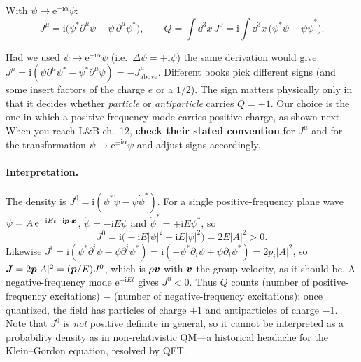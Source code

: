 \documentclass[11pt]{article}
\begin{document}
\begin{keyresult}
With $\psi\to\mathrm e^{-\mathrm i\alpha}\psi$:
\begin{equation}
  J^\mu=\mathrm i\big(\psi^*\partial^\mu\psi-\psi\,\partial^\mu\psi^*\big),\qquad Q=\int\dd^3x\,J^0=\mathrm i\int\dd^3x\,\big(\psi^*\dot\psi-\psi\dot\psi^*\big).
\end{equation}
\end{keyresult}

\begin{pitfall}
Had we used $\psi\to\mathrm e^{+\mathrm i\alpha}\psi$ (i.e.\ $\Delta\psi=+\mathrm i\psi$) the same derivation would give $J^\mu=\mathrm i(\psi\partial^\mu\psi^*-\psi^*\partial^\mu\psi)=-J^\mu_{\text{above}}$. Different books pick different signs (and some insert factors of the charge $e$ or a $1/2$). The sign matters physically only in that it decides whether \emph{particle} or \emph{antiparticle} carries $Q=+1$. Our choice is the one in which a positive-frequency mode carries positive charge, as shown next. When you reach L\&B ch.~12, \textbf{check their stated convention} for $J^\mu$ and for the transformation $\psi\to\mathrm e^{\pm\mathrm i\alpha}\psi$ and adjust signs accordingly.
\end{pitfall}

\paragraph{Interpretation.} The density is $J^0=\mathrm i(\psi^*\dot\psi-\psi\dot\psi^*)$. For a single positive-frequency plane wave $\psi=A\,\mathrm e^{-\mathrm iEt+\mathrm i\bm{p}\cdot\bm{x}}$, $\dot\psi=-\mathrm iE\psi$ and $\dot\psi^*=+\mathrm iE\psi^*$, so
\begin{equation}
  J^0=\mathrm i\big(-\mathrm iE|\psi|^2-\mathrm iE|\psi|^2\big)=2E|A|^2>0. 
\end{equation}
Likewise $J^i=\mathrm i(\psi^*\partial^i\psi-\psi\partial^i\psi^*)=\mathrm i(-\psi^*\partial_i\psi+\psi\partial_i\psi^*)=2p_i|A|^2$, so $\bm{J}=2\bm{p}|A|^2=(\bm{p}/E)J^0$, which is $\rho\bm{v}$ with $\bm{v}$ the group velocity, as it should be. A negative-frequency mode $\mathrm e^{+\mathrm iEt}$ gives $J^0<0$. Thus $Q$ counts (number of positive-frequency excitations) $-$ (number of negative-frequency excitations): once quantized, the field has particles of charge $+1$ and antiparticles of charge $-1$. Note that $J^0$ is \emph{not} positive definite in general, so it cannot be interpreted as a probability density as in non-relativistic QM---a historical headache for the Klein--Gordon equation, resolved by QFT.
\end{document}
